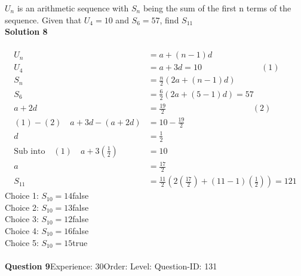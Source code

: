 \documentclass{article}
\begin{document}
$U_n$ is an arithmetic sequence with $S_n$ being the sum of the first n terms of the sequence. Given that $U_{4}=10$ and $S_{6}=57$, find $S_{11}$\\[4pt]
\noindent\textbf{Solution 8}\\[2pt]
\\[-35pt]\begin{align*}
U_n&=a+(n-1)d\\[2pt]
U_4&=a+3d=10 \hspace{85pt} (1)\\[2pt]
S_n&=\displaystyle\frac{n}{2}(2a+(n-1)d)\\[2pt]
S_6&=\displaystyle\frac{6}{2}(2a+(5-1)d)=57\\[2pt]
a+2d&=\displaystyle\frac{19}{2}\hspace{124pt}(2)\\[2pt]
(1)-(2) \quad a+3d-(a+2d)&=10-\displaystyle\frac{19}{2}\\[2pt]
d&=\displaystyle\frac{1}{2}\\[2pt]
\text{Sub into}\quad (1) \quad a+3\left(\displaystyle\frac{1}{2}\right)&=10\\[2pt]
a&=\displaystyle\frac{17}{2}\\[12pt]
S_{11}&=\displaystyle\frac{11}{2}\left(2\left(\displaystyle\frac{17}{2}\right)+(11-1)\left(\displaystyle\frac{1}{2}\right)\right)=121
\end{align*}
Choice 1: \hspace{20pt}$S_{10}=14$\hspace{20pt}false\\
Choice 2: \hspace{20pt}$S_{10}=13$\hspace{20pt}false\\
Choice 3: \hspace{20pt}$S_{10}=12$\hspace{20pt}false\\
Choice 4: \hspace{20pt}$S_{10}=16$\hspace{20pt}false\\
Choice 5: \hspace{20pt}$S_{10}=15$\hspace{20pt}true\\
\\[4pt]
\noindent\textbf{Question 9}\hspace{20pt}Experience: 30\hspace{20pt}Order: \hspace{20pt}Level: \hspace{20pt}Question-ID: 131\\[2pt]
\end{document}
